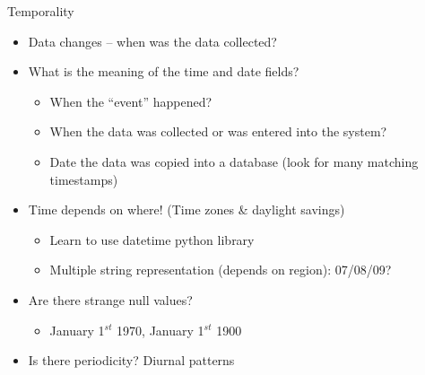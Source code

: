 \documentclass[aspectratio=169]{../latex_main/tntbeamer}  %
\begin{document}
	
	\begin{frame}{Temporality}
	    \begin{itemize}
	        \item Data changes – when was the data collected?
	        \item What is the meaning of the time and date fields?
	        \begin{itemize}
	            \item When the “event” happened?
	            \item When the data was collected or was entered into the system?
	            \item Date the data was copied into a database (look for many matching timestamps)
	        \end{itemize}
	        \item Time depends on where! (Time zones & daylight savings)
	        \begin{itemize}
	            \item Learn to use datetime python library
	            \item Multiple string representation (depends on region): 07/08/09?
	        \end{itemize}
	        \item Are there strange null values?
	        \begin{itemize}
	            \item January 1$^{st}$ 1970, January 1$^{st}$ 1900
	        \end{itemize}
	        \item Is there periodicity? Diurnal patterns
	    \end{itemize}
	\end{frame}
	
	
	
\end{document}

